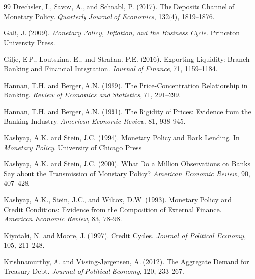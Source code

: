 \documentclass[12pt,a4paper]{article}
\begin{document}
\begin{thebibliography}{99}
Drechsler, I., Savov, A., and Schnabl, P. (2017).
\newblock The Deposits Channel of Monetary Policy.
\newblock \textit{Quarterly Journal of Economics}, 132(4), 1819--1876.

Gal\'{i}, J. (2009).
\newblock \textit{Monetary Policy, Inflation, and the Business Cycle}.
\newblock Princeton University Press.

Gilje, E.P., Loutskina, E., and Strahan, P.E. (2016).
\newblock Exporting Liquidity: Branch Banking and Financial Integration.
\newblock \textit{Journal of Finance}, 71, 1159--1184.

Hannan, T.H. and Berger, A.N. (1989).
\newblock The Price-Concentration Relationship in Banking.
\newblock \textit{Review of Economics and Statistics}, 71, 291--299.

Hannan, T.H. and Berger, A.N. (1991).
\newblock The Rigidity of Prices: Evidence from the Banking Industry.
\newblock \textit{American Economic Review}, 81, 938--945.

Kashyap, A.K. and Stein, J.C. (1994).
\newblock Monetary Policy and Bank Lending.
\newblock In \textit{Monetary Policy}. University of Chicago Press.

Kashyap, A.K. and Stein, J.C. (2000).
\newblock What Do a Million Observations on Banks Say about the Transmission of
  Monetary Policy?
\newblock \textit{American Economic Review}, 90, 407--428.

Kashyap, A.K., Stein, J.C., and Wilcox, D.W. (1993).
\newblock Monetary Policy and Credit Conditions: Evidence from the Composition
  of External Finance.
\newblock \textit{American Economic Review}, 83, 78--98.

Kiyotaki, N. and Moore, J. (1997).
\newblock Credit Cycles.
\newblock \textit{Journal of Political Economy}, 105, 211--248.

Krishnamurthy, A. and Vissing-J\o rgensen, A. (2012).
\newblock The Aggregate Demand for Treasury Debt.
\newblock \textit{Journal of Political Economy}, 120, 233--267.


\end{thebibliography}
\end{document}
